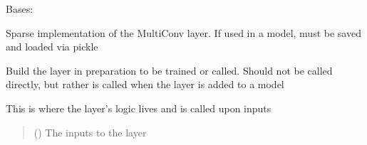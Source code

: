 \documentclass[letterpaper,10pt,english]{sphinxmanual}
\begin{document}
\begin{fulllineitems}
\label{\detokenize{beyondml.tflow.layers:beyondml.tflow.layers.SparseMultiConv3D.SparseMultiConv3D}}
\pysigstartsignatures
{}
\pysigstopsignatures
\sphinxAtStartPar
Bases: 

\sphinxAtStartPar
Sparse implementation of the MultiConv layer. If used in a model, must be saved and loaded via pickle

\begin{fulllineitems}
\label{\detokenize{beyondml.tflow.layers:beyondml.tflow.layers.SparseMultiConv3D.SparseMultiConv3D.build}}
\pysigstartsignatures
{}
\pysigstopsignatures
\sphinxAtStartPar
Build the layer in preparation to be trained or called. Should not be called directly,
but rather is called when the layer is added to a model

\end{fulllineitems}


\begin{fulllineitems}
\label{\detokenize{beyondml.tflow.layers:beyondml.tflow.layers.SparseMultiConv3D.SparseMultiConv3D.call}}
\pysigstartsignatures
{}
\pysigstopsignatures
\sphinxAtStartPar
This is where the layer’s logic lives and is called upon inputs
\begin{quote}\begin{description}
\sphinxAtStartPar
{} () \textendash{} The inputs to the layer


\end{description}
\end{quote}
\end{fulllineitems}
\end{fulllineitems}
\end{document}

